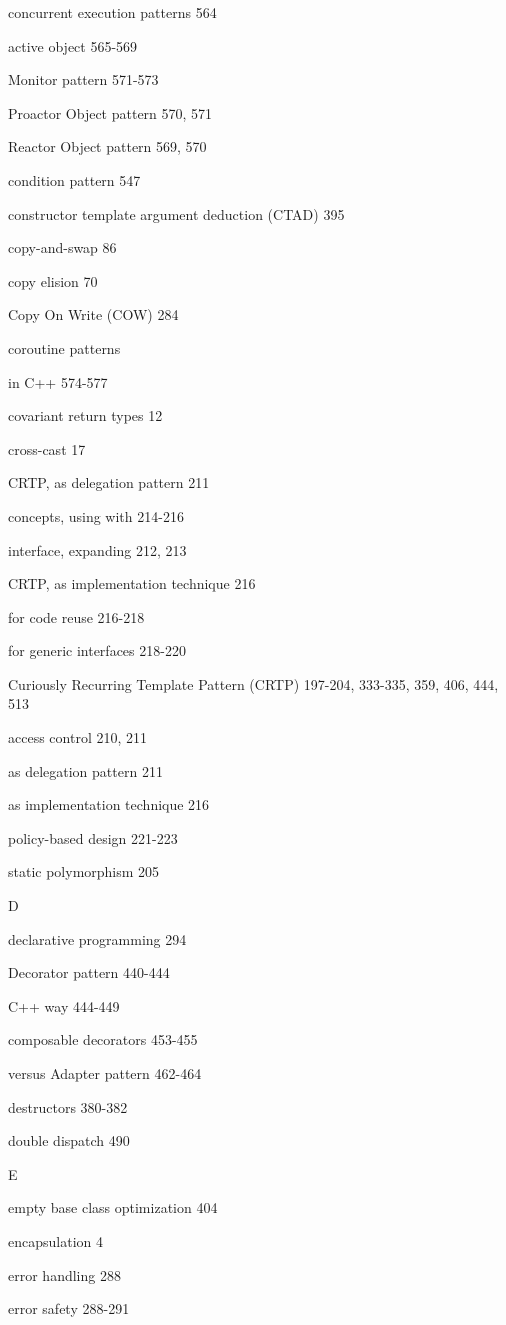 concurrent execution patterns 564

active object 565-569

Monitor pattern 571-573

Proactor Object pattern 570, 571

Reactor Object pattern 569, 570

condition pattern 547

constructor template argument deduction (CTAD) 395

copy-and-swap 86

copy elision 70

Copy On Write (COW) 284

coroutine patterns

in C++ 574-577

covariant return types 12

cross-cast 17

CRTP, as delegation pattern 211

concepts, using with 214-216

interface, expanding 212, 213

CRTP, as implementation technique 216

for code reuse 216-218

for generic interfaces 218-220

Curiously Recurring Template Pattern (CRTP) 197-204, 333-335, 359, 406, 444, 513

access control 210, 211

as delegation pattern 211

as implementation technique 216

policy-based design 221-223

static polymorphism 205

D

declarative programming 294

Decorator pattern 440-444

C++ way 444-449

composable decorators 453-455

versus Adapter pattern 462-464

destructors 380-382

double dispatch 490

E

empty base class optimization 404

encapsulation 4

error handling 288

error safety 288-291

